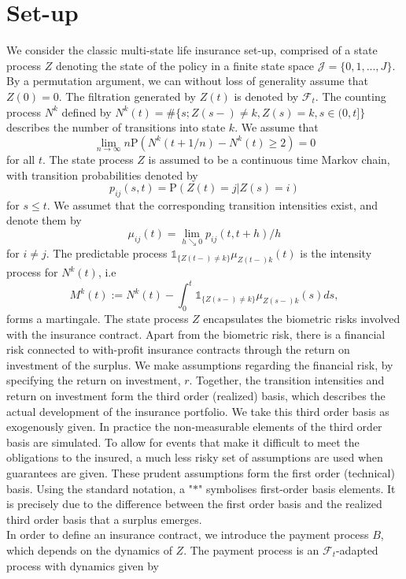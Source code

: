 \documentclass[12pt]{article}
\newcommand{\indic}[1]{\mathds{1}_{ \{ #1 \} }}
\renewcommand{\P}{\text{P}}
\theoremstyle{my_thm}
\begin{document}
\section{Set-up} \label{sec:Set_1}
We consider the classic multi-state life insurance set-up, comprised of a state process $Z$ denoting the state of the policy in a finite state space $\mathcal{J}=\{0,1,...,J\}$. By a permutation argument, we can without loss of generality assume that $Z(0)=0$. The filtration generated by $Z(t)$ is denoted by $\mathcal{F}_t$. The counting process $N^{k}$ defined by $N^{k}(t)=\# \{ s; Z(s-) \neq k, Z(s)=k, s \in (0,t] \}$ describes the number of transitions into state $k$. We assume that 
\begin{equation}
\lim_{n \rightarrow \infty} n \P( N^k(t+1/n) - N^k(t) \geq 2)=0 \label{eq:AAW}
\end{equation}
for all $t$. The state process $Z$ is assumed to be a continuous time Markov chain, with transition probabilities denoted by
$$
p_{ij}(s,t)= \P(Z(t)=j|Z(s)=i)
$$
for $s\leq t$. We assumet that the corresponding transition intensities exist, and denote them by
$$
\mu_{ij}(t)=\lim_{h \searrow 0} p_{ij}(t,t+h)/h
$$
for $i \neq j$. The predictable process $ \indic{Z(t-)\neq k }\mu_{Z(t-)k}(t)$ is the intensity process for $N^{k}(t)$, i.e
$$
M^{k}(t):=N^k(t)-\int_0^t \indic{Z(s-)\neq k } \mu_{Z(s-)k}(s) ds,
$$
forms a martingale. The state process $Z$ encapsulates the biometric risks involved with the insurance contract. Apart from the biometric risk, there is a financial risk connected to with-profit insurance contracts through the return on investment of the surplus. We make assumptions regarding the financial risk, by specifying the return on investment, $r$. Together, the transition intensities and return on investment form the third order (realized) basis, which describes the actual development of the insurance portfolio. We take this third order basis as exogenously given. In practice the non-measurable elements of the third order basis are simulated. To allow for events that make it difficult to meet the obligations to the insured, a much less risky set of assumptions are used when guarantees are given. These prudent assumptions form the first order (technical) basis. Using the standard notation, a "$*$" symbolises first-order basis elements. It is precisely due to the difference between the first order basis and the realized third order basis that a surplus emerges.
\\
In order to define an insurance contract, we introduce the payment process $B$, which depends on the dynamics of $Z$. The payment process is an $\mathcal{F}_t$-adapted process with dynamics given by
\end{document}
